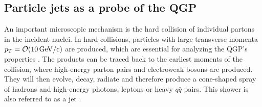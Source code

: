 \documentclass[
  a4paper,
  12pt,
  oneside,
  parskip=half,
  listof=totoc,
  bibliography=totoc,
  DIV=12,
  numbers=noenddot,
  BA.tex
  ]{subfiles}
\begin{document}
\subsection{Particle jets as a probe of the QGP}

An important microscopic mechanism is the hard collision of individual partons in the incident nuclei. In hard collisions, particles with large transverse momenta $p_T = \mathcal{O} (10\bunit{GeV/c})$ are produced, which are essential for analyzing the QGP's properties \cite{busza_heavy_2018}. The products can be traced back to the earliest moments of the collision, where high-energy parton pairs and electroweak bosons are produced. They will then evolve, decay, radiate and therefore produce a cone-shaped spray of hadrons and high-energy photons, leptons or heavy $q\bar{q}$ pairs. This shower is also referred to as a jet \cite{busza_heavy_2018}. 
\end{document}
